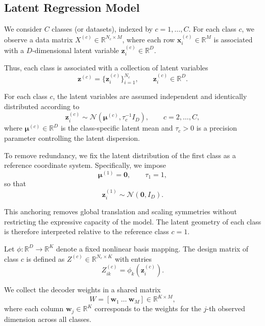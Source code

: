 \subsection{Latent Regression Model}\label{subsec:latent-regression-model2}

\newcommand{\vect}[1]{\bm{#1}}
\newcommand{\normsq}[1]{\left\lVert #1 \right\rVert^2}
\newcommand{\trans}[1]{#1^\top}
\newcommand{\Gam}[3]{\mathrm{Gamma} \left( #1 \;\middle|\; #2, #3\right)}
\newcommand{\Nor}[3]{\mathcal{N} \left( #1 \;\middle|\; #2, #3 \right)}
\newcommand{\avgz}{\overline{z}}
\newcommand{\avgzz}{\overline{zz}}

We consider $C$ classes (or datasets), indexed by $c = 1, \dots, C$.
For each class $c$, we observe a data matrix
$X^{(c)} \in \mathbb{R}^{N_c \times M}$, where each row
$\vect{x}_i^{(c)} \in \mathbb{R}^M$ is associated with a
$D$-dimensional latent variable $\vect{z}_i^{(c)} \in \mathbb{R}^D$.

Thus, each class is associated with a collection of latent variables
\[
    \vect{z}^{(c)} = \{\vect{z}_i^{(c)}\}_{i=1}^{N_c},
    \qquad \vect{z}_i^{(c)} \in \mathbb{R}^D.
\]

For each class $c$, the latent variables are assumed independent and identically distributed according to
\[
    \vect{z}_i^{(c)}
    \sim
    \mathcal{N}\!\left(\vect{\mu}^{(c)}, \tau_c^{-1} I_D \right),
    \qquad
    c = 2, \dots, C,
\]
where $\vect{\mu}^{(c)} \in \mathbb{R}^D$ is the class-specific latent mean and
$\tau_c > 0$ is a precision parameter controlling the latent dispersion.

To remove redundancy, we fix the latent distribution of the first class
as a reference coordinate system.
Specifically, we impose
\[
    \vect{\mu}^{(1)} = \vect{0},
    \qquad
    \tau_1 = 1,
\]
so that
\[
    \vect{z}_i^{(1)} \sim \mathcal{N}(\vect{0}, I_D).
\]

This anchoring removes global translation and scaling symmetries
without restricting the expressive capacity of the model.
The latent geometry of each class is therefore interpreted
relative to the reference class $c=1$.

Let $\phi: \mathbb{R}^D \to \mathbb{R}^K$ denote a fixed nonlinear basis mapping.
The design matrix of class $c$ is defined as
$Z^{(c)} \in \mathbb{R}^{N_c \times K}$ with entries
\[
    Z^{(c)}_{ik} = \phi_k(\vect{z}_i^{(c)}).
\]

We collect the decoder weights in a shared matrix
\[
    W = [\vect{w}_1 \ \dots \ \vect{w}_M]
    \in \mathbb{R}^{K \times M},
\]
where each column $\vect{w}_j \in \mathbb{R}^K$ corresponds to the weights for the $j$-th observed dimension
across all classes.

